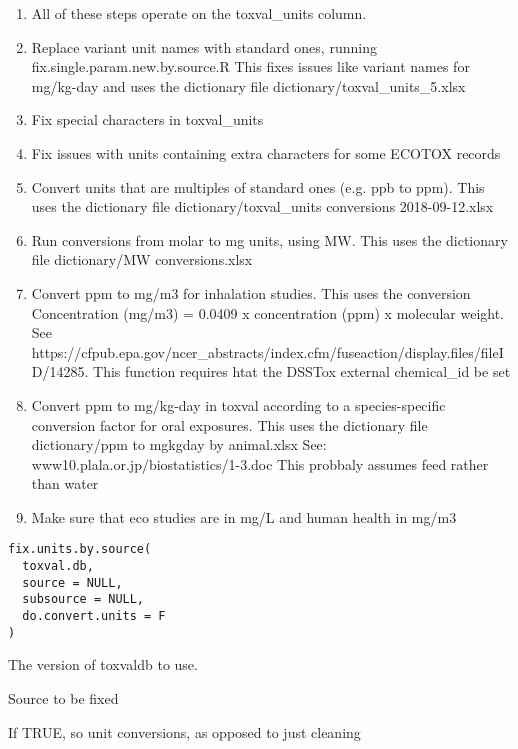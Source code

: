 \documentclass[letterpaper]{book}
\begin{document}
\begin{Description}\relax
\begin{enumerate}

\item{} All of these steps operate on the toxval\_units column.
\item{} Replace variant unit names with standard ones, running fix.single.param.new.by.source.R
This fixes issues like variant names for mg/kg-day and uses the dictionary
file dictionary/toxval\_units\_5.xlsx
\item{} Fix special characters in toxval\_units
\item{} Fix issues with units containing extra characters for some ECOTOX records
\item{} Convert units that are multiples of standard ones (e.g. ppb to ppm). This
uses the dictionary file dictionary/toxval\_units conversions 2018-09-12.xlsx
\item{} Run conversions from molar to mg units, using MW. This uses the dictionary file
dictionary/MW conversions.xlsx
\item{} Convert ppm to mg/m3 for inhalation studies. This uses the conversion Concentration
(mg/m3) = 0.0409 x concentration (ppm) x molecular weight. See
https://cfpub.epa.gov/ncer\_abstracts/index.cfm/fuseaction/display.files/fileID/14285.
This function requires htat the DSSTox external chemical\_id be set
\item{} Convert ppm to mg/kg-day in toxval according to a species-specific
conversion factor for oral exposures. This uses the dictionary file
dictionary/ppm to mgkgday by animal.xlsx
See: www10.plala.or.jp/biostatistics/1-3.doc
This probbaly assumes feed rather than water
\item{} Make sure that eco studies are in mg/L and human health in mg/m3

\end{enumerate}

\end{Description}
%
\begin{Usage}
\begin{verbatim}
fix.units.by.source(
  toxval.db,
  source = NULL,
  subsource = NULL,
  do.convert.units = F
)
\end{verbatim}
\end{Usage}
%
\begin{Arguments}
\begin{ldescription}
\item[\code{toxval.db}] The version of toxvaldb to use.

\item[\code{source}] Source to be fixed

\item[\code{do.convert.units}] If TRUE, so unit conversions, as opposed to just cleaning
\end{ldescription}
\end{Arguments}
\end{document}
